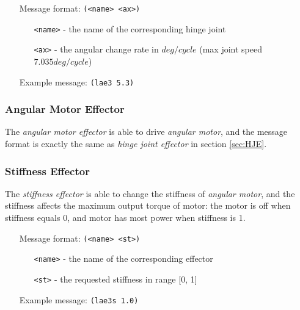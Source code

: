 \begin{itemize}
	\item[Message format:] \texttt{(<name> <ax>)}
		\begin{itemize}
		  \item[\texttt{<name>} -] the name of the corresponding hinge joint
		  \item[\texttt{<ax>} -] the angular change rate in $deg/cycle$ (max joint
		  speed $7.035 deg/cycle$)
		\end{itemize}
	\item[Example message:] \texttt{(lae3 5.3)}
\end{itemize}

\subsubsection{Angular Motor Effector}
\label{sec:AME}
The \emph{angular motor effector} is able to drive \emph{angular
  motor}, and the message format is exactly the same as \emph{hinge
  joint effector} in section \ref{sec:HJE}.

\subsubsection{Stiffness Effector}
\label{sec:AME}
The \emph{stiffness effector} is able to change the stiffness of
\emph{angular motor}, and the stiffness affects the maximum output
torque of motor: the motor is off when stiffness equals 0, and motor
has most power when stiffness is 1.

\begin{itemize}
	\item[Message format:] \texttt{(<name> <st>)}
		\begin{itemize}
		  \item[\texttt{<name>} -] the name of the corresponding effector
		  \item[\texttt{<st>} -] the requested stiffness in range [0, 1]
		\end{itemize}
	\item[Example message:] \texttt{(lae3s 1.0)}
\end{itemize}

